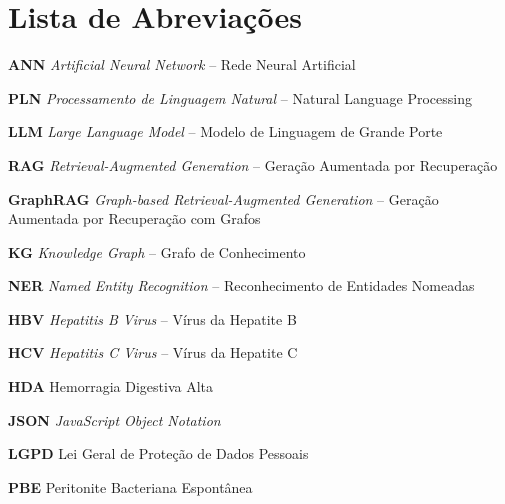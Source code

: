 \chapter*{Lista de Abreviações}

\begin{description}
    \item \textbf{ANN} \quad \textit{Artificial Neural Network} – Rede Neural Artificial
    \item \textbf{PLN} \quad \textit{Processamento de Linguagem Natural} – Natural Language Processing
    \item \textbf{LLM} \quad \textit{Large Language Model} – Modelo de Linguagem de Grande Porte
    \item \textbf{RAG} \quad \textit{Retrieval-Augmented Generation} – Geração Aumentada por Recuperação
    \item \textbf{GraphRAG} \quad \textit{Graph-based Retrieval-Augmented Generation} – Geração Aumentada por Recuperação com Grafos
    \item \textbf{KG} \quad \textit{Knowledge Graph} – Grafo de Conhecimento
    \item \textbf{NER} \quad \textit{Named Entity Recognition} – Reconhecimento de Entidades Nomeadas
    \item \textbf{HBV} \quad \textit{Hepatitis B Virus} – Vírus da Hepatite B
    \item \textbf{HCV} \quad \textit{Hepatitis C Virus} – Vírus da Hepatite C
    \item \textbf{HDA} \quad Hemorragia Digestiva Alta
    \item \textbf{JSON} \quad \textit{JavaScript Object Notation}
    \item \textbf{LGPD} \quad Lei Geral de Proteção de Dados Pessoais
    \item \textbf{PBE} \quad Peritonite Bacteriana Espontânea
\end{description}
